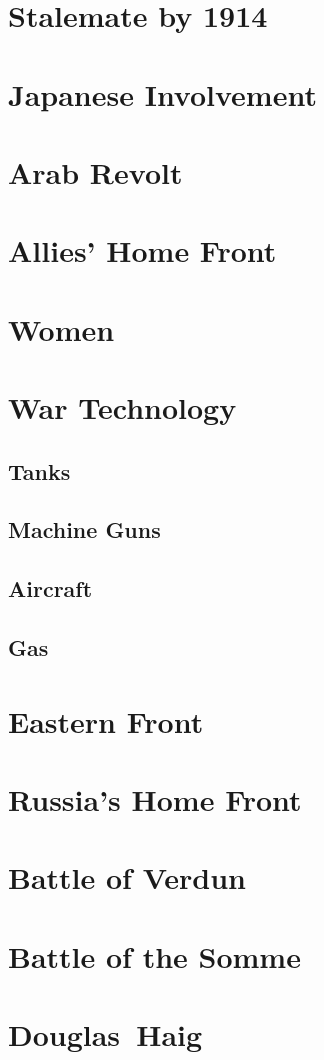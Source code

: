 \documentclass[a4paper,numbers=endperiod,most,twoside,english,final,openany]{scrbook} %
\begin{document}
\chapter{Stalemate by 1914}
\chapter{Japanese Involvement}
\chapter{Arab Revolt}
\chapter{Allies' Home Front}
\chapter{Women}
\chapter{War Technology}
\section{Tanks}
\section{Machine Guns}
\section{Aircraft}
\section{Gas}
\chapter{Eastern Front}
\chapter{Russia's Home Front}
\chapter{Battle of Verdun}
\chapter{Battle of the Somme}
\chapter{Douglas~Haig}
\end{document}
